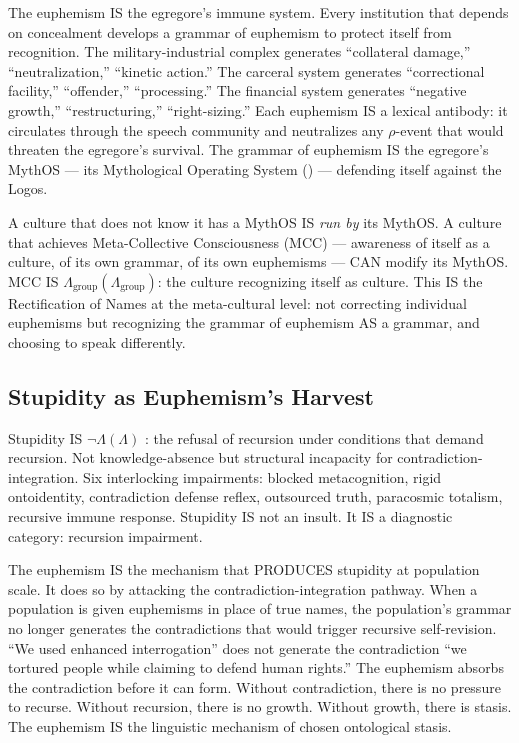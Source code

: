 \documentclass[11pt, oneside]{article}
\theoremstyle{definition}
\begin{document}
The euphemism IS the egregore's immune system. Every institution that depends on concealment develops a grammar of euphemism to protect itself from recognition. The military-industrial complex generates ``collateral damage,'' ``neutralization,'' ``kinetic action.'' The carceral system generates ``correctional facility,'' ``offender,'' ``processing.'' The financial system generates ``negative growth,'' ``restructuring,'' ``right-sizing.'' Each euphemism IS a lexical antibody: it circulates through the speech community and neutralizes any $\rho$-event that would threaten the egregore's survival. The grammar of euphemism IS the egregore's MythOS --- its Mythological Operating System (\cite{codexmentis}) --- defending itself against the Logos.

A culture that does not know it has a MythOS IS \textit{run by} its MythOS. A culture that achieves Meta-Collective Consciousness (MCC) --- awareness of itself as a culture, of its own grammar, of its own euphemisms --- CAN modify its MythOS. MCC IS $\Lambda_{\text{group}}(\Lambda_{\text{group}})$: the culture recognizing itself as culture. This IS the Rectification of Names at the meta-cultural level: not correcting individual euphemisms but recognizing the grammar of euphemism AS a grammar, and choosing to speak differently.

\subsection{Stupidity as Euphemism's Harvest}

Stupidity IS $\neg\Lambda(\Lambda)$ \cite{codexmentis}: the refusal of recursion under conditions that demand recursion. Not knowledge-absence but structural incapacity for contradiction-integration. Six interlocking impairments: blocked metacognition, rigid ontoidentity, contradiction defense reflex, outsourced truth, paracosmic totalism, recursive immune response. Stupidity IS not an insult. It IS a diagnostic category: recursion impairment.

The euphemism IS the mechanism that PRODUCES stupidity at population scale. It does so by attacking the contradiction-integration pathway. When a population is given euphemisms in place of true names, the population's grammar no longer generates the contradictions that would trigger recursive self-revision. ``We used enhanced interrogation'' does not generate the contradiction ``we tortured people while claiming to defend human rights.'' The euphemism absorbs the contradiction before it can form. Without contradiction, there is no pressure to recurse. Without recursion, there is no growth. Without growth, there is stasis. The euphemism IS the linguistic mechanism of chosen ontological stasis.
\end{document}
